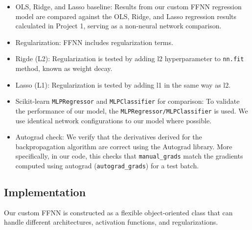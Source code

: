 \documentclass[amssymb,twocolumn,aps,floatfix]{revtex4-2}
\begin{document}
\begin{itemize}
    \item OLS, Ridge, and Lasso baseline: Results from our custom FFNN regression model are compared against the OLS, Ridge, and Lasso regression results calculated in Project 1, serving as a non-neural network comparison.  
    \item Regularization: FFNN includes regularization terms.
    \item Rigde (L2): Regularization is tested by adding l2 hyperparameter to \texttt{nn.fit} method, known as weight decay. 
    \item Lasso (L1): Regularization is tested by adding l1 in the same way as l2. 
    \item Scikit-learn \texttt{MLPRegressor} and \texttt{MLPClassifier} for comparison: To validate the performance of our model, the \texttt{MLPRegressor/MLPClassifier} is used. We use identical network configurations to our model where possible. 
    \item Autograd check: We verify that the derivatives derived for the backpropagation algorithm are correct using the Autograd library. More specifically, in our code, this checks that \texttt{manual\_grads} match the gradients computed using autograd (\texttt{autograd\_grads}) for a test batch. 
\end{itemize}

\subsection{Implementation}
\label{sec:implementation}


Our custom FFNN is constructed as a flexible object-oriented class that can handle different architectures, activation functions, and regularizations. 
\end{document}
